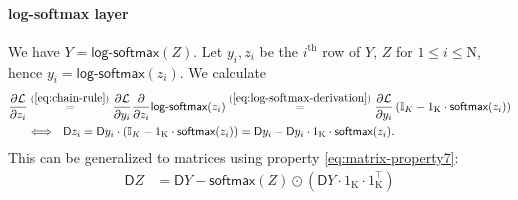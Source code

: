 \documentclass[twoside,11pt]{article}
\newcommand{\const}[1]{\ensuremath{\mathrm{#1}}} %
\newcommand{\func}[1]{\ensuremath{\textsf{#1}}} %
\newcommand{\Gradient}{\textsf{D}}
\newcommand{\Derivative}[2]{\ensuremath{\frac{\partial #1}{\partial #2}}}
\newcommand{\Partial}[1]{\frac{\partial}{\partial #1}}
\begin{document}
\paragraph{log-softmax layer}
We have $Y = \func{log-softmax}(Z)$.
Let $y_i, z_i$ be the $i^\text{th}$ row of $Y$, $Z$ for $1 \leq i \leq \const{N}$, hence $y_i = \func{log-softmax}(z_i)$.
We calculate
\begin{align*}
  \Derivative{\mathcal{L}}{z_i} 
  & \overset{(\ref{eq:chain-rule})}{=} 
    \Derivative{\mathcal{L}}{y_i} \Partial{z_i} \func{log-softmax}(z_i)
  \overset{(\ref{eq:log-softmax-derivation})}{=}
  \Derivative{\mathcal{L}}{y_i}
    \left( 
       \mathbb{I}_K - 1_\const{K} \cdot \func{softmax}(z_i)
    \right)
  \\
  & \Longleftrightarrow~~ \Gradient{z_i} = \Gradient{y_i} \cdot 
      \left( 
       \mathbb{I}_K - 1_\const{K} \cdot \func{softmax}(z_i)
    \right)
  = \Gradient y_i - \Gradient y_i \cdot 1_\const{K} \cdot \func{softmax}(z_i).  
\end{align*}
This can be generalized to matrices using property \ref{eq:matrix-property7}:
\begin{align}
\Gradient Z &= \Gradient Y - \func{softmax}(Z) \odot
(\Gradient Y \cdot 1_\const{K} \cdot 1_\const{K}^\top)
\end{align}
\end{document}
